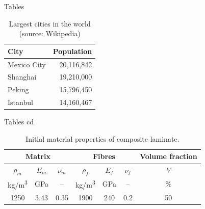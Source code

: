 \documentclass[10pt]{beamer} %
\begin{document}
\begin{frame}{Tables}
  \begin{table}
    \caption{Largest cities in the world (source: Wikipedia)}
    \begin{tabular}{lr}
      \toprule
      City & Population\\
      \midrule
      Mexico City & 20,116,842\\
      Shanghai & 19,210,000\\
      Peking & 15,796,450\\
      Istanbul & 14,160,467\\
      \bottomrule
    \end{tabular}
  \end{table}
\end{frame}
\begin{frame}{Tables cd}
\begin{table}
	\label{tab:mat_prop}
	\renewcommand{\arraystretch}{1.3}
	\centering \footnotesize
	\caption{Initial material properties of composite laminate.}
	\begin{tabular}{ccccccc} 
		\toprule
		\multicolumn{3}{c}{\textbf{Matrix} }	& \multicolumn{3}{c}{\textbf{Fibres} } & \textbf{Volume fraction}	 \\ 
		\midrule
		$\rho_m$ & $E_m$ & $\nu_m$  & $\rho_f$ & $E_f$ & $\nu_f$ & $V$\\
		kg/m\textsuperscript{3} &GPa& --  & kg/m\textsuperscript{3}  & GPa& -- & \%\\ 
		\cmidrule(lr){1-3} \cmidrule(lr){4-6} \cmidrule(lr){7-7}
		1250 &3.43& 0.35& 1900 & 240 & 0.2 & 50\\
		\bottomrule 
	\end{tabular} 
\end{table}
\end{frame}
\end{document}
